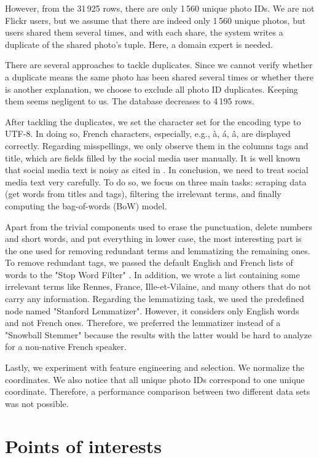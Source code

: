 \documentclass[runningheads]{llncs}
\begin{document}
However, from the 31\,925 rows, there are only 1\,560 unique photo IDs. We are not Flickr users, but we assume that there are indeed only 1\,560 unique photos, but users shared them several times, and with each share, the system writes a duplicate of the shared photo's tuple. Here, a domain expert is needed.

There are several approaches to tackle duplicates. Since we cannot verify whether a duplicate means the same photo has been shared several times or whether there is another explanation, we choose to exclude all photo ID duplicates. Keeping them seems negligent to us. The database decreases to 4\,195 rows.

After tackling the duplicates, we set the character set for the encoding type to UTF-8. In doing so, French characters, especially, e.g., à, á, â, are displayed correctly. Regarding misspellings, we only observe them in the columns tags and title, which are fields filled by the social media user manually. It is well known that social media text is noisy \cite{becker_2009, java_2007} as cited in \cite{baldwin_2013}. In conclusion, we need to treat social media text very carefully. To do so, we focus on three main tasks: scraping data (get words from titles and tags), filtering the irrelevant terms, and finally computing the bag-of-words (BoW) model.

Apart from the trivial components used to erase the punctuation, delete numbers and short words, and put everything in lower case, the most interesting part is the one used for removing redundant terms and lemmatizing the remaining ones. To remove redundant tags, we passed the default English and French lists of words to the "Stop Word Filter" \cite{stop_word_lists}. In addition, we wrote a list containing some irrelevant terms like Rennes, France, Ille-et-Vilaine, and many others that do not carry any information. Regarding the lemmatizing task, we used the predefined node named "Stanford Lemmatizer". However, it considers only English words and not French ones. Therefore, we preferred the lemmatizer instead of a "Snowball Stemmer" because the results with the latter would be hard to analyze for a non-native French speaker.

Lastly, we experiment with feature engineering and selection. We normalize the coordinates. We also notice that all unique photo IDs correspond to one unique coordinate. Therefore, a performance comparison between two different data sets was not possible.

\section{Points of interests}\label{analysis}
\end{document}

